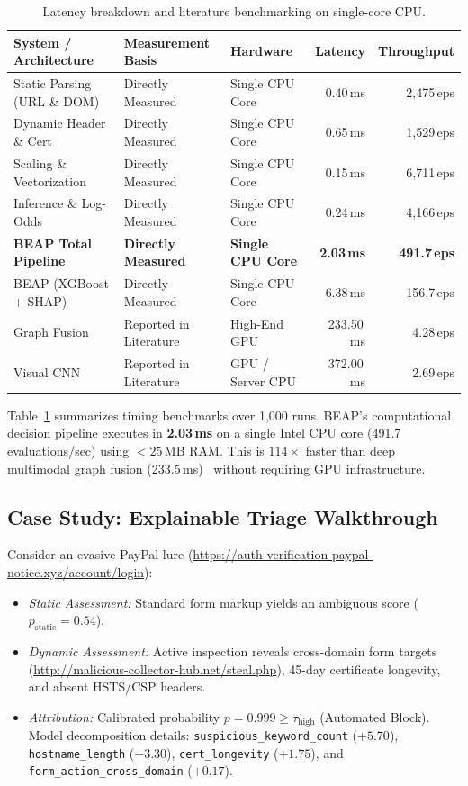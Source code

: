 \documentclass{llncs}
\begin{document}
\begin{table}[t]
\caption{Latency breakdown and literature benchmarking on single-core CPU.}
\label{tab:latency}
\centering
\setlength{\tabcolsep}{4.5pt}
\renewcommand{\arraystretch}{0.92}
\begin{tabular}{lllrr}
\toprule
\textbf{System / Architecture} & \textbf{Measurement Basis} & \textbf{Hardware} & \textbf{Latency} & \textbf{Throughput} \\
\midrule
Static Parsing (URL \& DOM) & Directly Measured & Single CPU Core & 0.40\,ms & 2,475\,eps \\
Dynamic Header \& Cert & Directly Measured & Single CPU Core & 0.65\,ms & 1,529\,eps \\
Scaling \& Vectorization & Directly Measured & Single CPU Core & 0.15\,ms & 6,711\,eps \\
Inference \& Log-Odds & Directly Measured & Single CPU Core & 0.24\,ms & 4,166\,eps \\
\textbf{BEAP Total Pipeline} & \textbf{Directly Measured} & \textbf{Single CPU Core} & \textbf{2.03\,ms} & \textbf{491.7\,eps} \\
BEAP (XGBoost + SHAP) & Directly Measured & Single CPU Core & 6.38\,ms & 156.7\,eps \\
Graph Fusion~\cite{kavya2025} & Reported in Literature & High-End GPU & 233.50\,ms & 4.28\,eps \\
Visual CNN~\cite{lin2021} & Reported in Literature & GPU / Server CPU & 372.00\,ms & 2.69\,eps \\
\bottomrule
\end{tabular}
\end{table}

Table~\ref{tab:latency} summarizes timing benchmarks over 1,000 runs. BEAP's computational decision pipeline executes in \textbf{2.03\,ms} on a single Intel CPU core (491.7 evaluations/sec) using $<25$\,MB RAM. This is $114\times$ faster than deep multimodal graph fusion (233.5\,ms)~\cite{kavya2025} without requiring GPU infrastructure.

\subsection{Case Study: Explainable Triage Walkthrough}

Consider an evasive PayPal lure (\url{https://auth-verification-paypal-notice.xyz/account/login}):
\begin{itemize}[leftmargin=1.5em]
    \item \textit{Static Assessment:} Standard form markup yields an ambiguous score ($p_{\text{static}} = 0.54$).
    \item \textit{Dynamic Assessment:} Active inspection reveals cross-domain form targets (\url{http://malicious-collector-hub.net/steal.php}), 45-day certificate longevity, and absent HSTS/CSP headers.
    \item \textit{Attribution:} Calibrated probability $p = 0.999 \ge \tau_{\text{high}}$ (Automated Block). Model decomposition details: \texttt{suspicious\_keyword\_count} ($+5.70$), \texttt{hostname\_length} ($+3.30$), \texttt{cert\_longevity} ($+1.75$), and \texttt{form\_action\_cross\_domain} ($+0.17$).
\end{itemize}
\end{document}
